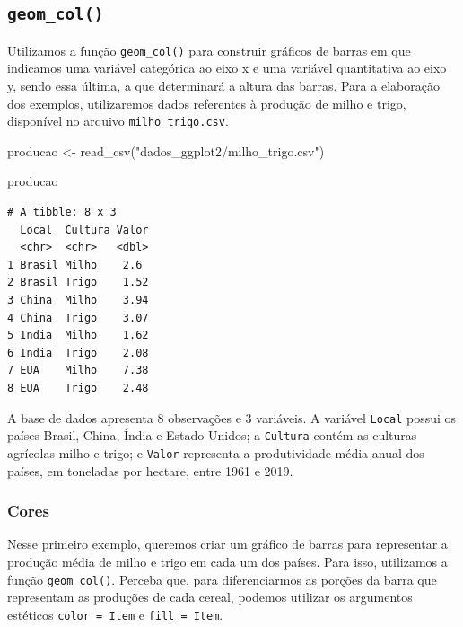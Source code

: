 \documentclass[
  brazilian,
]{book}
\newenvironment{Shaded}{\begin{snugshade}}{\end{snugshade}}
\newcommand{\FunctionTok}[1]{\textcolor[rgb]{0.00,0.00,0.00}{#1}}
\newcommand{\NormalTok}[1]{#1}
\newcommand{\OtherTok}[1]{\textcolor[rgb]{0.56,0.35,0.01}{#1}}
\newcommand{\StringTok}[1]{\textcolor[rgb]{0.31,0.60,0.02}{#1}}
\begin{document}
\hypertarget{geom_col}{%
\subsection*{\texorpdfstring{\texttt{geom\_col()}}{geom\_col()}}\label{geom_col}}

Utilizamos a função \texttt{geom\_col()} para construir gráficos de barras em que indicamos uma variável categórica ao eixo x e uma variável quantitativa ao eixo y, sendo essa última, a que determinará a altura das barras. Para a elaboração dos exemplos, utilizaremos dados referentes à produção de milho e trigo, disponível no arquivo \texttt{milho\_trigo.csv}.

\begin{Shaded}
\begin{Highlighting}[]
\NormalTok{producao }\OtherTok{\textless{}{-}} \FunctionTok{read\_csv}\NormalTok{(}\StringTok{"dados\_ggplot2/milho\_trigo.csv"}\NormalTok{)}

\NormalTok{producao}
\end{Highlighting}
\end{Shaded}

\begin{verbatim}
# A tibble: 8 x 3
  Local  Cultura Valor
  <chr>  <chr>   <dbl>
1 Brasil Milho    2.6 
2 Brasil Trigo    1.52
3 China  Milho    3.94
4 China  Trigo    3.07
5 India  Milho    1.62
6 India  Trigo    2.08
7 EUA    Milho    7.38
8 EUA    Trigo    2.48
\end{verbatim}

A base de dados apresenta 8 observações e 3 variáveis. A variável \texttt{Local} possui os países Brasil, China, Índia e Estado Unidos; a \texttt{Cultura} contém as culturas agrícolas milho e trigo; e \texttt{Valor} representa a produtividade média anual dos países, em toneladas por hectare, entre 1961 e 2019.

\hypertarget{cores-1}{%
\subsubsection{Cores}\label{cores-1}}

Nesse primeiro exemplo, queremos criar um gráfico de barras para representar a produção média de milho e trigo em cada um dos países. Para isso, utilizamos a função \texttt{geom\_col()}. Perceba que, para diferenciarmos as porções da barra que representam as produções de cada cereal, podemos utilizar os argumentos estéticos \texttt{color\ =\ Item} e \texttt{fill\ =\ Item}.
\end{document}
